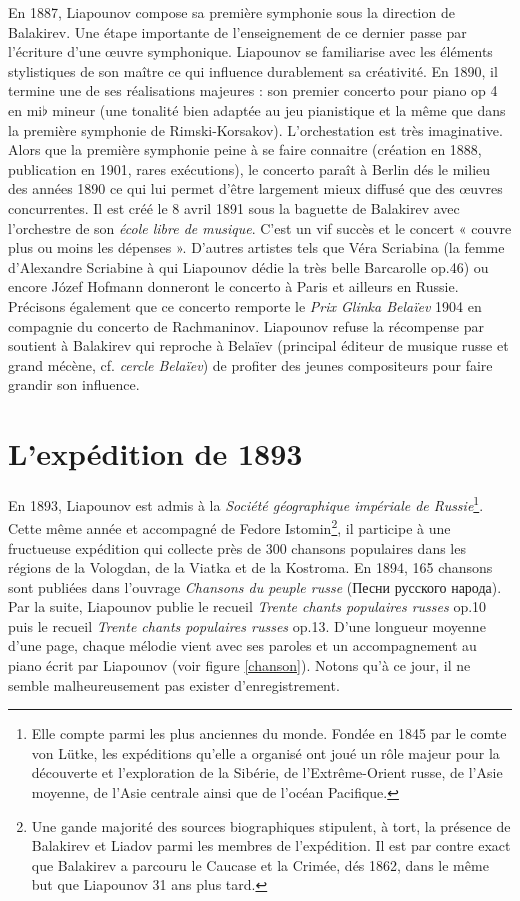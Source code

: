 En 1887, Liapounov compose sa première symphonie sous la direction de Balakirev. Une étape importante de l'enseignement de ce dernier passe par l'écriture d'une œuvre symphonique. Liapounov se familiarise avec les éléments stylistiques de son maître ce qui influence durablement sa créativité. En 1890, il termine une de ses réalisations majeures : son premier concerto pour piano op 4 en mi$\flat$ mineur (une tonalité bien adaptée au jeu pianistique et la même que dans la première symphonie de Rimski-Korsakov). L'orchestation est très imaginative. Alors que la première symphonie peine à se faire connaitre (création en 1888, publication en 1901, rares exécutions), le concerto paraît à Berlin dés le milieu des années 1890 ce qui lui permet d'être largement mieux diffusé que des œuvres concurrentes. Il est créé le 8 avril 1891 sous la baguette de Balakirev avec l'orchestre de son \emph{école libre de musique}. C'est un vif succès et le concert « couvre plus ou moins les dépenses ». D'autres artistes tels que Véra Scriabina (la femme d'Alexandre Scriabine à qui Liapounov dédie la très belle Barcarolle op.46) ou encore Józef Hofmann donneront le concerto à Paris et ailleurs en Russie. Précisons également que ce concerto remporte le \emph{Prix Glinka Belaïev} 1904 en compagnie du concerto  de Rachmaninov. Liapounov refuse la récompense par soutient à Balakirev qui reproche à Belaïev (principal éditeur de musique russe et grand mécène, cf. \emph{cercle Belaïev}) de profiter des jeunes compositeurs pour faire grandir son influence.

\section{L'expédition de 1893}

En 1893, Liapounov est admis à la \emph{Société géographique impériale de Russie}\footnote{Elle compte parmi les plus anciennes du monde. Fondée en 1845 par le comte von Lütke, les expéditions qu'elle a organisé ont joué un rôle majeur pour la découverte et l'exploration de la Sibérie, de l'Extrême-Orient russe, de l'Asie moyenne, de l'Asie centrale ainsi que de l'océan Pacifique.}. Cette même année et accompagné de Fedore Istomin\footnote{Une gande majorité des sources biographiques stipulent, à tort, la présence de Balakirev et Liadov parmi les membres de l'expédition. Il est par contre exact que Balakirev a parcouru le Caucase et la Crimée, dés 1862, dans le même but que Liapounov 31 ans plus tard.}, il participe à une fructueuse expédition qui collecte près de 300 chansons populaires dans les régions de la Vologdan, de la Viatka et de la Kostroma. En 1894, 165 chansons sont publiées dans l'ouvrage \emph{Chansons du peuple russe} (\foreignlanguage{russian}{Песни русского народа}). Par la suite, Liapounov publie le recueil \emph{Trente chants populaires russes} op.10 puis le recueil \emph{Trente chants populaires russes} op.13. D'une longueur moyenne d'une page, chaque mélodie vient avec ses paroles et un accompagnement au piano écrit par Liapounov (voir figure \ref{chanson}). Notons qu'à ce jour, il ne semble malheureusement pas exister d'enregistrement.\\

